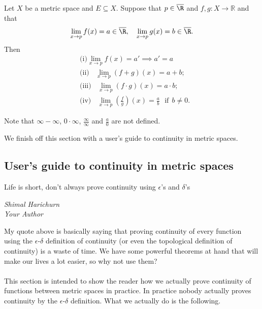 	 \begin{theorem}
	 		Let $X$ be a metric space and $E \subseteq X$. Suppose that $p \in \overline{\R}$ and $f, g : X \to \mathbb{R}$ and that $$\lim_{x \to p} f(x) = a \in \overline{\R}, \ \ \ \lim_{x \to p} g(x) = b \in \overline{\R}.$$Then  	
	 		\begin{align*}
	 		&\text{(i)} \lim_{x \to p} f(x) = a' \implies a' = a\\
	 		&\text{(ii)} \ \  \ \ \lim_{x \to p}(f+g)(x) = a + b; \\
	 		&\text{(iii)} \ \  \ \ \lim_{x \to p}(f\cdot g)(x) = a \cdot b; \\
	 		&\text{(iv)} \ \  \ \ \lim_{x \to p}\left( \frac{f}{g}\right) (x) = \frac{a}{b} \ \ \ \text{if} \ \ b\neq 0.
	 		\end{align*}	 		
	 \end{theorem}
	 
	 \begin{point}
	 	Note that $\infty -\infty$, $0 \cdot \infty$, $\frac{\infty}{\infty}$ and $\frac{a}{0}$ are not defined.
	 \end{point}
	 
	 
	 We finish off this section with a user's guide to continuity in metric spaces.
	 
	 \newpage
	 \subsection{User's guide to continuity in metric spaces}
	 
	 \epigraph{Life is short, don't always prove continuity using $\epsilon$'s and $\delta$'s}{\textit{Shimal Harichurn \\ Your Author}}
	 
	 My quote above is basically saying that proving continuity of every function using the $\epsilon$-$\delta$ definition of continuity (or even the topological definition of continuity) is a waste of time. We have some powerful theorems at hand that will make our lives a lot easier, so why not use them?  \\ \\ This section is intended to show the reader how we actually prove continuity of functions between metric spaces in practice. In practice nobody actually proves continuity by the $\epsilon$-$\delta$ definition. What we actually do is the following.
	 
